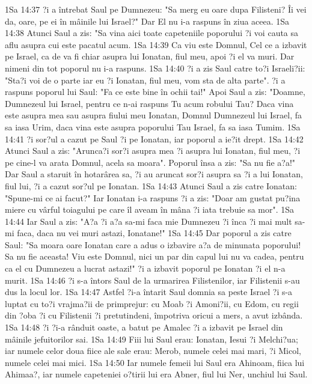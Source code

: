1Sa 14:37  ?i a întrebat Saul pe Dumnezeu: "Sa merg eu oare dupa Filisteni? Îi vei da, oare, pe ei în mâinile lui Israel?" Dar El nu i-a raspuns în ziua aceea.
1Sa 14:38  Atunci Saul a zis: "Sa vina aici toate capeteniile poporului ?i voi cauta sa aflu asupra cui este pacatul acum.
1Sa 14:39  Ca viu este Domnul, Cel ce a izbavit pe Israel, ca de va fi chiar asupra lui Ionatan, fiul meu, apoi ?i el va muri. Dar nimeni din tot poporul nu i-a raspuns.
1Sa 14:40  ?i a zis Saul catre to?i Israeli?ii: "Sta?i voi de o parte iar eu ?i Ionatan, fiul meu, vom sta de alta parte". ?i a raspuns poporul lui Saul: "Fa ce este bine în ochii tai!" Apoi Saul a zis: "Doamne, Dumnezeul lui Israel, pentru ce n-ai raspuns Tu acum robului Tau? Daca vina este asupra mea sau asupra fiului meu Ionatan, Domnul Dumnezeul lui Israel, fa sa iasa Urim, daca vina este asupra poporului Tau Israel, fa sa iasa Tumim.
1Sa 14:41  ?i sor?ul a cazut pe Saul ?i pe Ionatan, iar poporul a ie?it drept.
1Sa 14:42  Atunci Saul a zis: "Arunca?i sor?i asupra mea ?i asupra lui Ionatan, fiul meu, ?i pe cine-l va arata Domnul, acela sa moara". Poporul însa a zis: "Sa nu fie a?a!" Dar Saul a staruit în hotarârea sa, ?i au aruncat sor?i asupra sa ?i a lui Ionatan, fiul lui, ?i a cazut sor?ul pe Ionatan.
1Sa 14:43  Atunci Saul a zis catre Ionatan: "Spune-mi ce ai facut?" Iar Ionatan i-a raspuns ?i a zis: "Doar am gustat pu?ina miere cu vârful toiagului pe care îl aveam în mâna ?i iata trebuie sa mor".
1Sa 14:44  Iar Saul a zis: "A?a ?i a?a sa-mi faca mie Dumnezeu ?i înca ?i mai mult sa-mi faca, daca nu vei muri astazi, Ionatane!"
1Sa 14:45  Dar poporul a zis catre Saul: "Sa moara oare Ionatan care a adus o izbavire a?a de minunata poporului! Sa nu fie aceasta! Viu este Domnul, nici un par din capul lui nu va cadea, pentru ca el cu Dumnezeu a lucrat astazi!" ?i a izbavit poporul pe Ionatan ?i el n-a murit.
1Sa 14:46  ?i s-a întors Saul de la urmarirea Filistenilor, iar Filistenii s-au dus la locul lor.
1Sa 14:47  Astfel ?i-a întarit Saul domnia sa peste Israel ?i s-a luptat cu to?i vrajma?ii de primprejur: cu Moab ?i Amoni?ii, cu Edom, cu regii din ?oba ?i cu Filistenii ?i pretutindeni, împotriva oricui a mers, a avut izbânda.
1Sa 14:48  ?i ?i-a rânduit oaste, a batut pe Amalec ?i a izbavit pe Israel din mâinile jefuitorilor sai.
1Sa 14:49  Fiii lui Saul erau: Ionatan, Iesui ?i Melchi?ua; iar numele celor doua fiice ale sale erau: Merob, numele celei mai mari, ?i Micol, numele celei mai mici.
1Sa 14:50  Iar numele femeii lui Saul era Ahinoam, fiica lui Ahimaa?, iar numele capeteniei o?tirii lui era Abner, fiul lui Ner, unchiul lui Saul.

